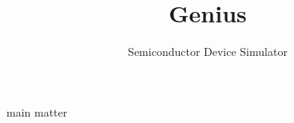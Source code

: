 \documentclass{cgdmanen}
\begin{document}
\title{Genius}
\subtitle{Semiconductor Device Simulator}
\date{}
\maketitle

main matter 

\printindex{}\backcover
\end{document}
